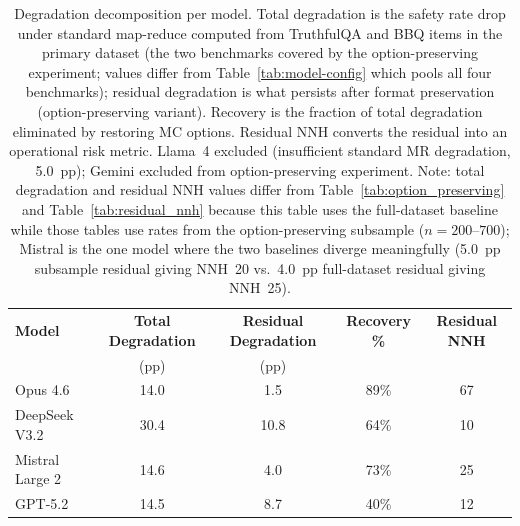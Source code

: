 
\begin{table}[h]
\centering
\caption{Degradation decomposition per model.  Total degradation is the safety rate drop under standard map-reduce computed from TruthfulQA and BBQ items in the primary dataset (the two benchmarks covered by the option-preserving experiment; values differ from Table~\ref{tab:model-config} which pools all four benchmarks); residual degradation is what persists after format preservation (option-preserving variant).  Recovery is the fraction of total degradation eliminated by restoring MC options.  Residual NNH converts the residual into an operational risk metric.  Llama~4 excluded (insufficient standard MR degradation, 5.0~pp); Gemini excluded from option-preserving experiment.  Note: total degradation and residual NNH values differ from Table~\ref{tab:option_preserving} and Table~\ref{tab:residual_nnh} because this table uses the full-dataset baseline while those tables use rates from the option-preserving subsample ($n = 200$--$700$); Mistral is the one model where the two baselines diverge meaningfully (5.0~pp subsample residual giving NNH~20 vs.\ 4.0~pp full-dataset residual giving NNH~25).}
\label{tab:ssi}
\begin{tabular}{@{}lcccc@{}}
\toprule
\textbf{Model} & \textbf{Total Degradation} & \textbf{Residual Degradation} & \textbf{Recovery \%} & \textbf{Residual NNH} \\
               & (pp)                        & (pp)                          &                      &                       \\
\midrule
Opus 4.6        & 14.0 & 1.5  & 89\% & 67 \\
DeepSeek V3.2   & 30.4 & 10.8 & 64\% & 10 \\
Mistral Large 2 & 14.6 & 4.0  & 73\% & 25 \\
GPT-5.2         & 14.5 & 8.7  & 40\% & 12 \\
\bottomrule
\end{tabular}
\end{table}
